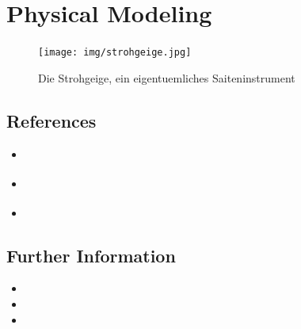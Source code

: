 \chapter{Physical Modeling}
\label{Karplus}

\begin{figure}[h]
  \begin{center}
    \texttt{[image: img/strohgeige.jpg]}
    \caption{Die Strohgeige, ein eigentuemliches Saiteninstrument}
    \label{fig:metering}
  \end{center}
\end{figure}


\section{References}

\begin{itemize}
  \item \cite{bilbao_numerical_2009}
  \item \cite{smith_physical_2010}
  \item \cite{cook_real_2002}
\end{itemize}









\section{Further Information}

\begin{itemize}
  \item {}
  \item {}
  \item {}
\end{itemize}



